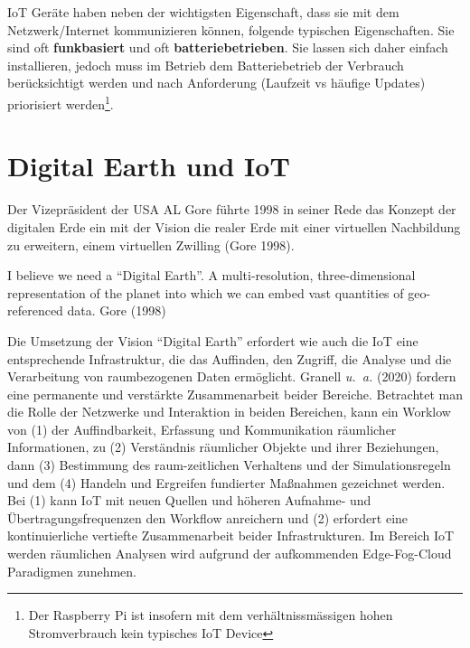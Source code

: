\documentclass[
  11pt,
  a4paper,
  oneside, openany  ,captions=tableheading
]{scrbook}
\theoremstyle{remark}
\renewenvironment{quote}{\begin{customblockquote}\list{}{\rightmargin=0em\leftmargin=0em}%
\item\relax\color{blockquote-text}\ignorespaces}{\unskip\unskip\endlist\end{customblockquote}}
\begin{document}
IoT Geräte haben neben der wichtigsten Eigenschaft, dass sie mit dem
Netzwerk/Internet kommunizieren können, folgende typischen
Eigenschaften. Sie sind oft \textbf{funkbasiert} und oft
\textbf{batteriebetrieben}. Sie lassen sich daher einfach installieren,
jedoch muss im Betrieb dem Batteriebetrieb der Verbrauch berücksichtigt
werden und nach Anforderung (Laufzeit vs häufige Updates) priorisiert
werden\footnote{Der Raspberry Pi ist insofern mit dem
  verhältnissmässigen hohen Stromverbrauch kein typisches IoT Device}.

\section{Digital Earth und IoT}\label{digital-earth-und-iot}

Der Vizepräsident der USA AL Gore führte 1998 in seiner Rede das Konzept
der digitalen Erde ein mit der Vision die realer Erde mit einer
virtuellen Nachbildung zu erweitern, einem virtuellen Zwilling (Gore
1998).

\begin{quote}
I believe we need a ``Digital Earth''. A multi-resolution,
three-dimensional representation of the planet into which we can embed
vast quantities of geo-referenced data. Gore (1998)
\end{quote}

Die Umsetzung der Vision ``Digital Earth''
erfordert wie auch die IoT eine entsprechende Infrastruktur, die das
Auffinden, den Zugriff, die Analyse und die Verarbeitung von
raumbezogenen Daten ermöglicht. Granell \emph{u.~a.} (2020) fordern eine
permanente und verstärkte Zusammenarbeit beider Bereiche. Betrachtet man
die Rolle der Netzwerke und Interaktion in beiden Bereichen, kann ein
Worklow von (1) der Auffindbarkeit, Erfassung und Kommunikation
räumlicher Informationen, zu (2) Verständnis räumlicher Objekte und
ihrer Beziehungen, dann (3) Bestimmung des raum-zeitlichen Verhaltens
und der Simulationsregeln und dem (4) Handeln und Ergreifen fundierter
Maßnahmen gezeichnet werden. Bei (1) kann IoT mit neuen Quellen und
höheren Aufnahme- und Übertragungsfrequenzen den Workflow anreichern und
(2) erfordert eine kontinuierliche vertiefte Zusammenarbeit beider
Infrastrukturen. Im Bereich IoT werden räumlichen Analysen wird aufgrund
der aufkommenden Edge-Fog-Cloud Paradigmen zunehmen.
\end{document}
